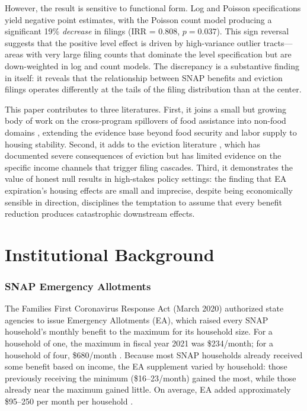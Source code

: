 \documentclass[12pt]{article}
\begin{document}
However, the result is sensitive to functional form. Log and Poisson specifications yield negative point estimates, with the Poisson count model producing a significant 19\% \emph{decrease} in filings (IRR = 0.808, $p = 0.037$). This sign reversal suggests that the positive level effect is driven by high-variance outlier tracts---areas with very large filing counts that dominate the level specification but are down-weighted in log and count models. The discrepancy is a substantive finding in itself: it reveals that the relationship between SNAP benefits and eviction filings operates differently at the tails of the filing distribution than at the center.

This paper contributes to three literatures. First, it joins a small but growing body of work on the cross-program spillovers of food assistance into non-food domains \citep{HoynesSchanzenbach2009, Ganong2019, Bronchetti2019}, extending the evidence base beyond food security and labor supply to housing stability. Second, it adds to the eviction literature \citep{Desmond2016Evicted, CollinsonHumphries2023, Humphries2019}, which has documented severe consequences of eviction but has limited evidence on the specific income channels that trigger filing cascades. Third, it demonstrates the value of honest null results in high-stakes policy settings: the finding that EA expiration's housing effects are small and imprecise, despite being economically sensible in direction, disciplines the temptation to assume that every benefit reduction produces catastrophic downstream effects.

\section{Institutional Background}

\subsubsection*{SNAP Emergency Allotments}  The Families First Coronavirus Response Act (March 2020) authorized state agencies to issue Emergency Allotments (EA), which raised every SNAP household's monthly benefit to the maximum for its household size. For a household of one, the maximum in fiscal year 2021 was \$234/month; for a household of four, \$680/month \citep{USDAFNS2023}. Because most SNAP households already received some benefit based on income, the EA supplement varied by household: those previously receiving the minimum (\$16--23/month) gained the most, while those already near the maximum gained little. On average, EA added approximately \$95--250 per month per household \citep{CBPP2022EA}.
\end{document}
